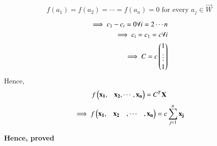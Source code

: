\begin{align}
f(a_1) = f(a_2) = \cdots = f(a_n) = 0 \mbox{ for every } a_j \in \vec{W}
\end{align}
\begin{align}
\implies c_1 - c_i = 0 \forall i= 2\cdots n\\
\implies c_i = c_1 = c \forall i\\
\implies C = c\begin{pmatrix}1\\\vdots\\1\end{pmatrix}
\end{align}
Hence,
\begin{align}
f\begin{pmatrix}\mathbf{x_1},&\mathbf{x_2},\cdots ,\mathbf{x_n}\end{pmatrix} = C^T\mathbf{X}
\end{align}
\begin{align}
\implies f\begin{pmatrix}\mathbf{x_1},&\mathbf{x_2}&,\cdots &,\mathbf{x_n}\end{pmatrix} = c\sum_{j=1}^{n}\mathbf{x_j}
\end{align}
\begin{center}
\textbf{Hence, proved}
\end{center}

